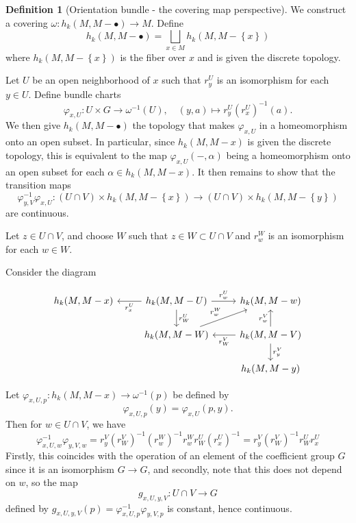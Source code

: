 \documentclass[reqno]{amsart}
\theoremstyle{definition}
\newtheorem{definition}[theorem]{Definition}
\theoremstyle{remark}
\begin{document}
\begin{definition}[Orientation bundle - the covering map perspective]
    We construct a covering
    $\omega \colon h_k(M, M - \bullet) \to  M$.
    Define
    \[
    h_k(M, M - \bullet) =
    \bigsqcup_{x \in M} 
    h_k(M, M- \left\{ x \right\} )
    \] 
    where $h_k(M, M - \left\{ x \right\} )$ is
    the fiber over $x$ and is given
    the discrete topology.

    Let $U$ be an open neighborhood of
    $x$ such that $r_{y}^{U}$ is an isomorphism
    for each $y \in U$.
    Define bundle charts
    \[
    \varphi_{x,U} \colon U \times G
    \to \omega^{-1} (U), \quad
    (y,a) \mapsto r_y^{U}\left( r_x^{U} \right)^{-1} (a).
    \] 
    We then give $h_k(M, M - \bullet)$ the
    topology that makes
    $\varphi_{x,U}$ in a homeomorphism onto
    an open subset. In particular, since
    $h_k(M,M-x)$ is given the
    discrete topology, this is equivalent to
    the map $\varphi_{x,U}(-,\alpha)$ being a homeomorphism
    onto an open subset for each
    $\alpha \in 
    h_k(M, M- x)$.
    It then remains to show that the transition maps
    \[
    \varphi_{y,V}^{-1} \varphi_{x,U} \colon
    (U \cap V) \times 
    h_k(M, M - \left\{ x \right\} )
    \to \left( U \cap V \right) \times 
    h_k(M, M- \left\{ y \right\} )
    \] 
    are continuous.

    Let $z \in U \cap V$, and choose $W$ such that
    $z \in W \subset U \cap V$ and
    $r_{w}^{W}$ is an isomorphism for each $w \in W$.

    Consider the diagram

    \begin{equation*}
    \begin{tikzcd}
        h_k(M, M - x) & \ar[l, "r_x^{U}"] 
        h_k(M, M -U) \ar[r, "r_w^{U}"] 
        \ar[d, "r_{W}^{U}"] & 
        h_k(M, M - w) \\
        & h_k(M, M -W) \ar[ru, "r_w^{W}"] 
        & h_k(M, M - V) \ar[l, "r_W^{V}"] 
        \ar[u, "r_w^{V}"] \ar[d, "r_y^{V}"] \\
        && h_k(M,M-y)
    \end{tikzcd}
    \end{equation*}

    Let
    $\varphi_{x,U,p} \colon
    h_k(M, M- x) \to 
    \omega^{-1}(p)$ be defined by
    \[
    \varphi_{x,U,p}(y) = 
    \varphi_{x,U}(p,y).
    \] 
    Then for $w \in U \cap V$, we have
    \[
    \varphi_{x,U,w}^{-1}
    \varphi_{y,V,w} = r_y^{V} (r_W^{V})^{-1} (r_w^{W})^{-1}
    r_w^{W} r_{W}^{U} (r_x^{U})^{-1} = 
    r_y^{V} (r_W^{V})^{-1} r_{W}^{U} r_x^{U}
    \] 
    Firstly, this coincides with the operation of
    an element of the coefficient group
    $G$ since it is an isomorphism
    $G \to G$, and secondly, 
    note that this does not depend on $w$,
    so the map
    \[
    g_{x,U,y,V} \colon U \cap V \to 
    G
    \]  
    defined by
    $g_{x,U,y,V}(p) = \varphi_{x,U,p}^{-1}
    \varphi_{y,V,p}$ is constant, hence continuous.\\
    \linebreak
    

\end{definition}
\end{document}
